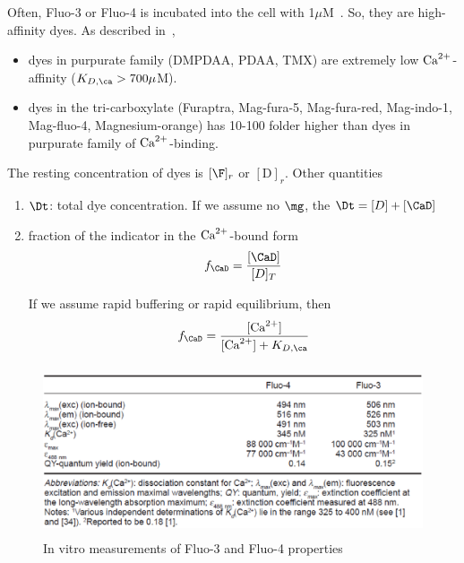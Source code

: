 Often, Fluo-3 or Fluo-4 is incubated into the cell with
1$\mu$M~\citep{gee2000}. So, they are high-affinity dyes.
As described in~\citep{baylor2010},
\begin{itemize}
\item dyes in purpurate family (DMPDAA, PDAA, TMX) are extremely low
  ${\text{Ca}^{2+}}$-affinity ($K_{D,\ca}>700\mu$M).

\item dyes in the tri-carboxylate (Furaptra, Mag-fura-5, Mag-fura-red,
  Mag-indo-1, Mag-fluo-4, Magnesium-orange) has 10-100 folder higher
  than dyes in purpurate family of ${\text{Ca}^{2+}}$-binding.
\end{itemize}



\begin{framed}
  The resting concentration of dyes is $[\F]_r$ or $[\text{D}]_r$.
    Other quantities
  \begin{enumerate}
  \item $\Dt$: total dye concentration. If we assume no $\mg$, the
    $\Dt= [D]+[\CaD]$


  \item fraction of the indicator in the ${\text{Ca}^{2+}}$-bound form
    \begin{equation}
      \label{eq:992}
      f_{\CaD} = \frac{[\CaD]}{[D]_T}
    \end{equation}

    If we assume rapid buffering or rapid equilibrium, then
    \begin{equation}
      \label{eq:993}
      f_\CaD = \frac{[\Ca]}{[\Ca]+K_{D,\ca}}
    \end{equation}

  \end{enumerate}
\end{framed}


\begin{figure}[hbt]
  \centerline{\includegraphics[height=5cm,
    angle=0]{./images/fluo-3_fluo-4.eps}}
  \caption{In vitro measurements of Fluo-3 and Fluo-4 properties}
  \label{fig:fluo-3_fluo-4}
\end{figure}


